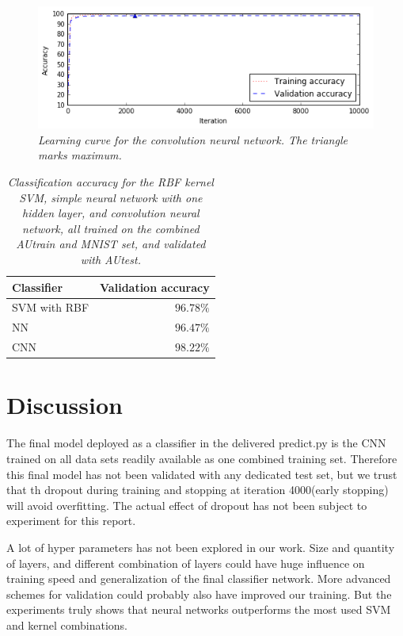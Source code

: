 \documentclass[a4paper,10pt,article,oneside,english]{memoir}
\let\oldcaption\caption
\renewcommand{\caption}[1]{\oldcaption{\emph{#1}}}
\begin{document}
	\begin{figure}[h!]
		\centering
		\includegraphics[width=0.9\linewidth]{cnn_learning.png}
		\caption{Learning curve for the convolution neural network. The triangle marks maximum.}
		\label{fig:cnn_learning}
	\end{figure}
	
	
	
	
	
	\begin{table}[h!]
		\centering
		\caption{Classification accuracy for the RBF kernel SVM, simple neural network with one hidden layer, and convolution neural network, all trained on the combined AUtrain and MNIST set, and validated with AUtest. }
		\label{tab:classifier_accuracy}
		\begin{tabular}{lr}
			Classifier & Validation accuracy \\ 
			\hline 
			SVM with RBF & $96.78\%$ \\ 
			NN & $96.47\%$ \\ 
			CNN & $98.22\%$ 
		\end{tabular} 
	\end{table}
	
	
	
	
	
	
	\chapter{Discussion}
	The final model deployed as a classifier in the delivered predict.py is the CNN trained on all data sets readily available as one combined training set. Therefore this final model has not been validated with any dedicated test set, but we trust that th dropout during training and stopping at iteration 4000(early stopping) will avoid overfitting. The actual effect of dropout has not been subject to experiment for this report. 
	
	A lot of hyper parameters has not been explored in our work. Size and quantity of layers, and different combination of layers could have huge influence on training speed and generalization of the final classifier network. More advanced schemes for validation could probably also have improved our training. 
	But the experiments truly shows that neural networks outperforms the most used SVM and kernel combinations.
	
	
	
	
\end{document}
